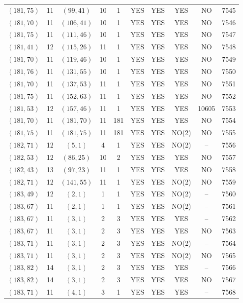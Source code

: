 \begin{longtable}{|c|c|c|c|c|c|c|c|c|c|}
$(181, 75)$ & 11 & $(99, 41)$ & 10 & 1 & YES & YES & YES & NO & 7545\\
$(181, 70)$ & 11 & $(106, 41)$ & 10 & 1 & YES & YES & YES & NO & 7546\\
$(181, 75)$ & 11 & $(111, 46)$ & 10 & 1 & YES & YES & YES & NO & 7547\\
$(181, 41)$ & 12 & $(115, 26)$ & 11 & 1 & YES & YES & YES & NO & 7548\\
$(181, 70)$ & 11 & $(119, 46)$ & 10 & 1 & YES & YES & YES & NO & 7549\\
$(181, 76)$ & 11 & $(131, 55)$ & 10 & 1 & YES & YES & YES & NO & 7550\\
$(181, 70)$ & 11 & $(137, 53)$ & 11 & 1 & YES & YES & YES & NO & 7551\\
$(181, 75)$ & 11 & $(152, 63)$ & 11 & 1 & YES & YES & YES & NO & 7552\\
$(181, 53)$ & 12 & $(157, 46)$ & 11 & 1 & YES & YES & YES & 10605 & 7553\\
$(181, 70)$ & 11 & $(181, 70)$ & 11 & 181 & YES & YES & YES & NO & 7554\\
$(181, 75)$ & 11 & $(181, 75)$ & 11 & 181 & YES & YES & NO(2) & NO & 7555\\
$(182, 71)$ & 12 & $(5, 1)$ & 4 & 1 & YES & YES & NO(2) & -- & 7556\\
$(182, 53)$ & 12 & $(86, 25)$ & 10 & 2 & YES & YES & YES & NO & 7557\\
$(182, 43)$ & 13 & $(97, 23)$ & 11 & 1 & YES & YES & YES & NO & 7558\\
$(182, 71)$ & 12 & $(141, 55)$ & 11 & 1 & YES & YES & NO(2) & NO & 7559\\
$(183, 49)$ & 12 & $(2, 1)$ & 1 & 1 & YES & YES & NO(2) & -- & 7560\\
$(183, 67)$ & 11 & $(2, 1)$ & 1 & 1 & YES & YES & NO(2) & -- & 7561\\
$(183, 67)$ & 11 & $(3, 1)$ & 2 & 3 & YES & YES & YES & -- & 7562\\
$(183, 67)$ & 11 & $(3, 1)$ & 2 & 3 & YES & YES & YES & NO & 7563\\
$(183, 71)$ & 11 & $(3, 1)$ & 2 & 3 & YES & YES & NO(2) & -- & 7564\\
$(183, 71)$ & 11 & $(3, 1)$ & 2 & 3 & YES & YES & NO(2) & NO & 7565\\
$(183, 82)$ & 14 & $(3, 1)$ & 2 & 3 & YES & YES & YES & -- & 7566\\
$(183, 82)$ & 14 & $(3, 1)$ & 2 & 3 & YES & YES & YES & NO & 7567\\
$(183, 71)$ & 11 & $(4, 1)$ & 3 & 1 & YES & YES & YES & -- & 7568\\

\end{longtable}
